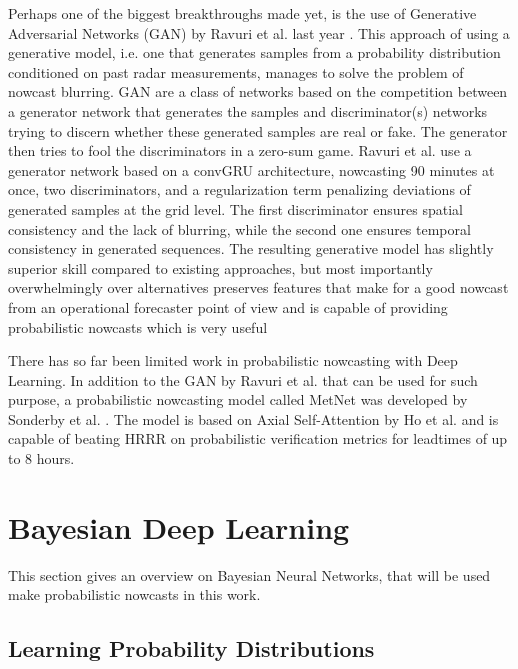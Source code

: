 Perhaps one of the biggest breakthroughs made yet, is the use of Generative Adversarial Networks (GAN) by Ravuri et al. last year \cite{ravuri_skilful_2021}. This approach of using a generative model, i.e. one that generates samples from a probability distribution conditioned on past radar measurements, manages to solve the problem of nowcast blurring. GAN are a class of networks based on the competition between a generator network that generates the samples and discriminator(s) networks trying to discern whether these generated samples are real or fake. The generator then tries to fool the discriminators in a zero-sum game. Ravuri et al. use a generator network based on a convGRU architecture, nowcasting 90 minutes at once, two discriminators, and a regularization term penalizing deviations of generated samples at the grid level. The first discriminator ensures spatial consistency and the lack of blurring, while the second one ensures temporal consistency in generated sequences. The resulting generative model has slightly superior skill compared to existing approaches, but most importantly overwhelmingly over alternatives preserves features that make for a good nowcast from an operational forecaster point of view and is capable of providing probabilistic nowcasts which is very useful \cite{ravuri_skilful_2021}

There has so far been limited work in probabilistic nowcasting with Deep Learning. In addition to the GAN by Ravuri et al. that can be used for such purpose, a probabilistic nowcasting model called MetNet was developed by Sonderby et al. \cite{sonderby_metnet_2020}. The model is based on Axial Self-Attention by Ho et al. \cite{ho_axial_2019} and is capable of beating HRRR on probabilistic verification metrics for leadtimes of up to 8 hours. 
 
\section{Bayesian Deep Learning}

This section gives an overview on Bayesian Neural Networks, that will be used make probabilistic nowcasts in this work.

\subsection{Learning Probability Distributions}

